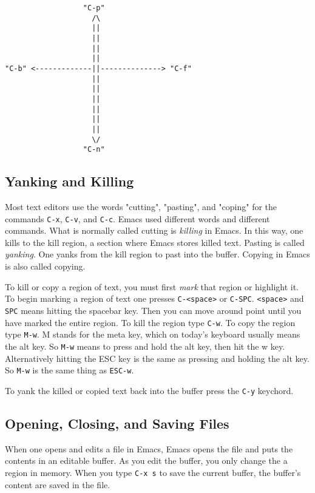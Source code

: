 \documentclass[11pt]{article}
\begin{document}
\begin{verbatim}
                  "C-p"
                    /\
                    ||
                    ||
                    ||
                    ||
"C-b" <-------------||--------------> "C-f"
                    ||
                    ||
                    ||
                    ||
                    ||
                    ||
                    \/
                  "C-n"
\end{verbatim}

\subsection{Yanking and Killing}
\label{sec:orgheadline5}
Most text editors use the words "cutting", "pasting", and "coping" for the commands \texttt{C-x}, \texttt{C-v}, and \texttt{C-c}.  Emacs used different words and different commands.  What is normally called cutting is \emph{killing} in Emacs.  In this way, one kills to the kill region, a section where Emacs stores killed text.  Pasting is called \emph{yanking}.  One yanks from the kill region to past into the buffer.  Copying in Emacs is also called copying.

To kill or copy a region of text, you must first \emph{mark} that region or highlight it.  To begin marking a region of text one presses \texttt{C-<space>} or \texttt{C-SPC}.  \texttt{<space>} and \texttt{SPC} means hitting the spacebar key.    Then you can move around point until you have marked the entire region.  To kill the region type \texttt{C-w}.  To copy the region type \texttt{M-w}.  M stands for the meta key, which on today's keyboard usually means the alt key.  So \texttt{M-w} means to press and hold the alt key, then hit the w key.  Alternatively hitting the ESC key is the same as pressing and holding the alt key.  So \texttt{M-w} is the same thing as \texttt{ESC-w}.

To yank the killed or copied text back into the buffer press the \texttt{C-y} keychord.

\subsection{Opening, Closing, and Saving Files}
\label{sec:orgheadline7}
When one opens and edits a file in Emacs, Emacs opens the file and puts the contents in an editable buffer.  As you edit the buffer, you only change the a region in memory.  When you type \texttt{C-x s} to save the current buffer, the buffer's content are saved in the file.
\end{document}
